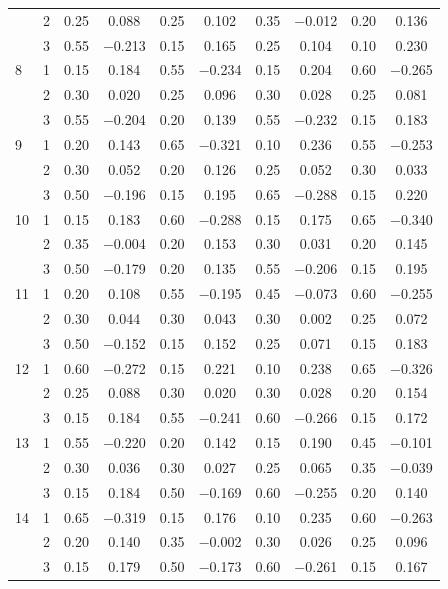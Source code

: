 \begin{longtable}{llcccccccc}
   & 2 & 0.25 & 0.088 & 0.25 & 0.102 & 0.35 & $-$0.012 & 0.20 & 0.136 \\ 
   & 3 & 0.55 & $-$0.213 & 0.15 & 0.165 & 0.25 & 0.104 & 0.10 & 0.230 \\ 
  8 & 1 & 0.15 & 0.184 & 0.55 & $-$0.234 & 0.15 & 0.204 & 0.60 & $-$0.265 \\ 
   & 2 & 0.30 & 0.020 & 0.25 & 0.096 & 0.30 & 0.028 & 0.25 & 0.081 \\ 
   & 3 & 0.55 & $-$0.204 & 0.20 & 0.139 & 0.55 & $-$0.232 & 0.15 & 0.183 \\ 
  9 & 1 & 0.20 & 0.143 & 0.65 & $-$0.321 & 0.10 & 0.236 & 0.55 & $-$0.253 \\ 
   & 2 & 0.30 & 0.052 & 0.20 & 0.126 & 0.25 & 0.052 & 0.30 & 0.033 \\ 
   & 3 & 0.50 & $-$0.196 & 0.15 & 0.195 & 0.65 & $-$0.288 & 0.15 & 0.220 \\ 
  10 & 1 & 0.15 & 0.183 & 0.60 & $-$0.288 & 0.15 & 0.175 & 0.65 & $-$0.340 \\ 
   & 2 & 0.35 & $-$0.004 & 0.20 & 0.153 & 0.30 & 0.031 & 0.20 & 0.145 \\ 
   & 3 & 0.50 & $-$0.179 & 0.20 & 0.135 & 0.55 & $-$0.206 & 0.15 & 0.195 \\ 
  11 & 1 & 0.20 & 0.108 & 0.55 & $-$0.195 & 0.45 & $-$0.073 & 0.60 & $-$0.255 \\ 
   & 2 & 0.30 & 0.044 & 0.30 & 0.043 & 0.30 & 0.002 & 0.25 & 0.072 \\ 
   & 3 & 0.50 & $-$0.152 & 0.15 & 0.152 & 0.25 & 0.071 & 0.15 & 0.183 \\ 
  12 & 1 & 0.60 & $-$0.272 & 0.15 & 0.221 & 0.10 & 0.238 & 0.65 & $-$0.326 \\ 
   & 2 & 0.25 & 0.088 & 0.30 & 0.020 & 0.30 & 0.028 & 0.20 & 0.154 \\ 
   & 3 & 0.15 & 0.184 & 0.55 & $-$0.241 & 0.60 & $-$0.266 & 0.15 & 0.172 \\ 
  13 & 1 & 0.55 & $-$0.220 & 0.20 & 0.142 & 0.15 & 0.190 & 0.45 & $-$0.101 \\ 
   & 2 & 0.30 & 0.036 & 0.30 & 0.027 & 0.25 & 0.065 & 0.35 & $-$0.039 \\ 
   & 3 & 0.15 & 0.184 & 0.50 & $-$0.169 & 0.60 & $-$0.255 & 0.20 & 0.140 \\ 
  14 & 1 & 0.65 & $-$0.319 & 0.15 & 0.176 & 0.10 & 0.235 & 0.60 & $-$0.263 \\ 
   & 2 & 0.20 & 0.140 & 0.35 & $-$0.002 & 0.30 & 0.026 & 0.25 & 0.096 \\ 
   & 3 & 0.15 & 0.179 & 0.50 & $-$0.173 & 0.60 & $-$0.261 & 0.15 & 0.167 \\ 

\end{longtable}
